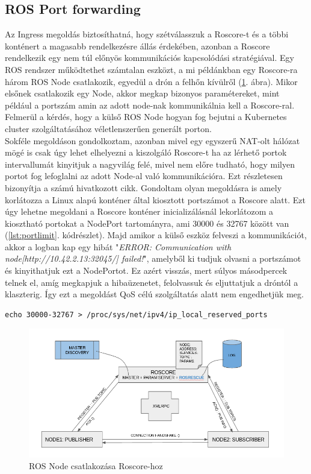 \subsection{ROS Port forwarding}
Az Ingress megoldás biztosíthatná, hogy szétválasszuk a Roscore-t és a többi konténert a magasabb rendelkezésre állás érdekében, azonban a Roscore rendelkezik egy nem túl előnyös kommunikációs kapcsolódási stratégiával. Egy ROS rendszer működtethet számtalan eszközt, a mi példánkban egy Roscore-ra három ROS Node csatlakozik, egyedül a drón a felhőn kívülről (\ref{fig:rosjoin}. ábra). Mikor elsőnek csatlakozik egy Node, akkor megkap bizonyos paramétereket, mint például a portszám amin az adott node-nak kommunikálnia kell a Roscore-ral. Felmerül a kérdés, hogy a külső ROS Node hogyan fog bejutni a Kubernetes cluster szolgáltatásához véletlenszerűen generált porton. \\

\noindent
Sokféle megoldáson gondolkoztam, azonban mivel egy egyszerű NAT-olt hálózat mögé is csak úgy lehet elhelyezni a kiszolgáló Roscore-t ha az lérhető portok intervallumát kinyitjuk a nagyvilág felé, mivel nem előre tudható, hogy milyen portot fog lefoglalni az adott Node-al való kommunikációra. Ezt részletesen bizonyítja a \cite{portforward} számú hivatkozott cikk. Gondoltam olyan megoldásra is amely korlátozza a Linux alapú konténer által kiosztott portszámot a Roscore alatt. Ezt úgy lehetne megoldani a Roscore konténer inicializálásnál lekorlátozom a kiosztható portokat a NodePort tartományra, ami 30000 és 32767 között van (\ref{lst:portlimit}. kódrészlet). Majd amikor a külső eszköz felveszi a kommunikációt, akkor a logban kap egy hibát "\emph{ERROR: Communication with node[http://10.42.2.13:32045/] failed!}", amelyből ki tudjuk olvasni a portszámot és kinyithatjuk ezt a NodePortot. Ez azért visszás, mert súlyos másodpercek telnek el, amíg megkapjuk a hibaüzenetet, felolvassuk és eljuttatjuk a dróntól a klaszterig. Így ezt a megoldást QoS célú szolgáltatás alatt nem engedhetjük meg.

\begin{lstlisting}[caption={Linuxon kiosztható port korlátozása}, label={lst:portlimit}]
echo 30000-32767 > /proc/sys/net/ipv4/ip_local_reserved_ports
\end{lstlisting}

\begin{figure}
	\centering
	\includegraphics[width=\linewidth]{figures/rosjoin.png}
	\caption{ROS Node csatlakozása Roscore-hoz \cite{rosjoin}}
	\label{fig:rosjoin}
\end{figure}


